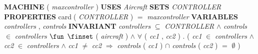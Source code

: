 %
\bsetindent
\begin{tabbing}
\bSetTabs
%
%
\bbnl
{\bf MACHINE} \bhsp{} ( {\em maxcontroller\/} )  \-\label{Controller}
%
%
\bbnl
{\bf USES} \+ \bbnl
{\em Aircraft\/}\label{Aircraft}  \-
%
%
\bbnl
{\bf SETS} \+ \bbnl
{\em CONTROLLER\/}\label{CONTROLLER}  \-
%
%
\bbnl
{\bf PROPERTIES} \+ \bbnl
 {\sf card}$\;$( {\em CONTROLLER\/} )  $=$ {\em maxcontroller\/} \-
%
%
\bbnl
{\bf VARIABLES} \+ \bbnl
{\em controllers\/}\label{controllers}  , {\em controls\/}\label{controls}  \-
%
%
\bbnl
{\bf INVARIANT} \+ \bbnl
{\em controllers\/} $\subseteq$ {\em CONTROLLER\/} $\wedge$ \bnl
{\em controls\/} $\in$ {\em controllers\/} $\fun$  $\finset$ ( {\em aircraft\/}\label{aircraft}  ) $\wedge$ \bnl
$\forall$ ( {\em cc1\/} , {\em cc2\/} ) . ( {\em cc1\/} $\in$ {\em controllers\/} $\wedge$ \bnl
{\em cc2\/} $\in$ {\em controllers\/} $\wedge$
{\em cc1\/} $\neq$ {\em cc2\/} $\Rightarrow$ \bnl
{\em controls\/} ( {\em cc1\/} )  $\cap$ {\em controls\/} ( {\em cc2\/} )  $=$  $\emptyset$  )
\end{tabbing}
\bresetindent
%
%
\vspace{-4.5ex}\bsetindent
